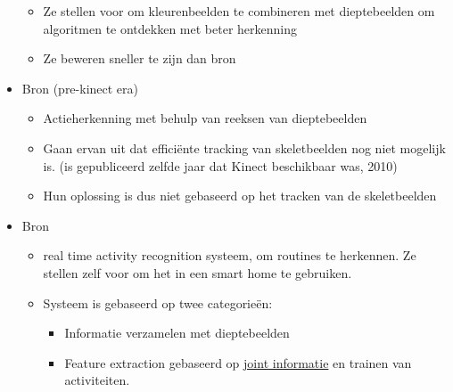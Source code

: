 \begin{itemize}
\begin{itemize}
			\item {\color{green}Ze stellen voor om kleurenbeelden te combineren met dieptebeelden om algoritmen te ontdekken met beter herkenning}
			
			\item Ze beweren sneller te zijn dan bron \cite{action-recognition-based-bag-3d-points}
		\end{itemize}
	\item Bron \cite{action-recognition-based-bag-3d-points} (pre-kinect era)
	\begin{itemize}
		\item Actieherkenning met behulp van reeksen van dieptebeelden
		\item Gaan ervan uit dat efficiënte tracking van skeletbeelden nog niet mogelijk is. (is gepubliceerd zelfde jaar dat Kinect beschikbaar was, 2010)
		\item Hun oplossing is dus niet gebaseerd op het tracken van de skeletbeelden
	\end{itemize}

	\item Bron \cite{detecting-complex-3d-human-motions-with-body-model-low-rank-representation-foror-real-time-smart-activity-monitoring-system}
	\begin{itemize}
		\item real time activity recognition systeem, om routines te herkennen. Ze stellen zelf voor om het in een smart home te gebruiken.
		\item Systeem is gebaseerd op twee categorieën:
		\begin{itemize}
			\item Informatie verzamelen met dieptebeelden
			\item Feature extraction gebaseerd op \underline{joint informatie} en trainen van activiteiten.
		\end{itemize}
	\end{itemize}


\end{itemize}

